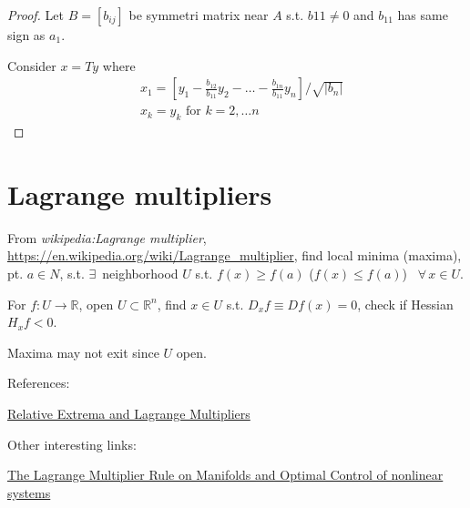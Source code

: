 \begin{proof}
  Let $B = [b_{ij}]$ be symmetri matrix near $A$ s.t. $b{11} \neq 0$ and $b_{11}$ has same sign as $a_1$.

    Consider $x=Ty$ where
    \[
\begin{aligned}
&  x_1 = \left[ y_1 - \frac{b_{12}}{b_{11}} y_2 - \dots - \frac{b_{1n}}{b_{11}} y_n \right] / \sqrt{ |b_n | } \\ 
& x_k = y_k \text{ for } k = 2, \dots n 
  \end{aligned}
    \]
  \end{proof}


\section{Lagrange multipliers}

From \emph{wikipedia:Lagrange multiplier}, \url{https://en.wikipedia.org/wiki/Lagrange_multiplier},
find local minima (maxima), pt. $a\in N$, s.t. $\exists \, $ neighborhood $U$ s.t. $f(x) \geq f(a)$ ($f(x) \leq f(a)$) \, $\forall \, x\in U$.

For $f:U\to \mathbb{R}$, open $U\subset \mathbb{R}^n$, find $x\in U$ s.t. $D_xf \equiv Df(x) =0$, check if Hessian $H_x f<0$.

Maxima may not exit since $U$ open.


References:

\href{http://www.math.uni.wroc.pl/~karch/analiza_nieliniowa/18_mnozniki-lagrangea.pdf}{Relative Extrema and Lagrange Multipliers}

Other interesting links:

\href{http://oai.cwi.nl/oai/asset/2552/2552A.pdf}{The Lagrange Multiplier Rule on Manifolds and Optimal Control of nonlinear systems}


